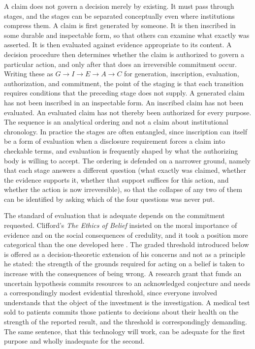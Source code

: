 \documentclass[11pt]{article}
\theoremstyle{plain}
\theoremstyle{definition}
\theoremstyle{remark}
\begin{document}
A claim does not govern a decision merely by existing. It must pass through stages, and the stages can be separated conceptually even where institutions compress them. A claim is first generated by someone. It is then inscribed in some durable and inspectable form, so that others can examine what exactly was asserted. It is then evaluated against evidence appropriate to its content. A decision procedure then determines whether the claim is authorized to govern a particular action, and only after that does an irreversible commitment occur. Writing these as $G \to I \to E \to A \to C$ for generation, inscription, evaluation, authorization, and commitment, the point of the staging is that each transition requires conditions that the preceding stage does not supply. A generated claim has not been inscribed in an inspectable form. An inscribed claim has not been evaluated. An evaluated claim has not thereby been authorized for every purpose. The sequence is an analytical ordering and not a claim about institutional chronology. In practice the stages are often entangled, since inscription can itself be a form of evaluation when a disclosure requirement forces a claim into checkable terms, and evaluation is frequently shaped by what the authorizing body is willing to accept. The ordering is defended on a narrower ground, namely that each stage answers a different question (what exactly was claimed, whether the evidence supports it, whether that support suffices for this action, and whether the action is now irreversible), so that the collapse of any two of them can be identified by asking which of the four questions was never put.

The standard of evaluation that is adequate depends on the commitment requested. Clifford's \textit{The Ethics of Belief} insisted on the moral importance of evidence and on the social consequences of credulity, and it took a position more categorical than the one developed here \citep{clifford1877}. The graded threshold introduced below is offered as a decision-theoretic extension of his concerns and not as a principle he stated: the strength of the grounds required for acting on a belief is taken to increase with the consequences of being wrong. A research grant that funds an uncertain hypothesis commits resources to an acknowledged conjecture and needs a correspondingly modest evidential threshold, since everyone involved understands that the object of the investment is the investigation. A medical test sold to patients commits those patients to decisions about their health on the strength of the reported result, and the threshold is correspondingly demanding. The same sentence, that this technology will work, can be adequate for the first purpose and wholly inadequate for the second.
\end{document}
